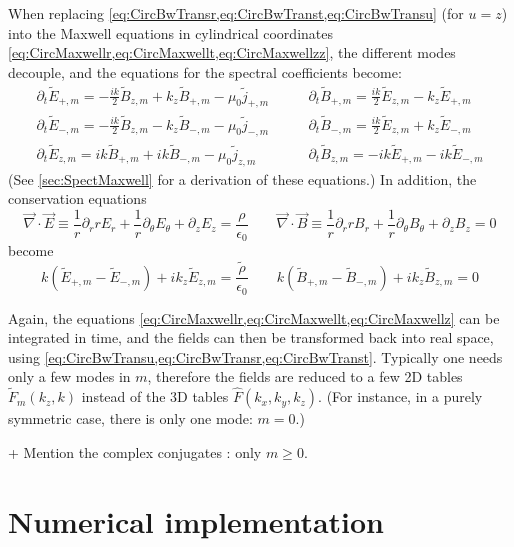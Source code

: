 \documentclass[a4paper]{article}   	%
\newcommand{\ir}{\frac{1}{r}}
\begin{document}
When replacing \cref{eq:CircBwTransr,eq:CircBwTranst,eq:CircBwTransu}
(for $u=z$) into the Maxwell equations in cylindrical
coordinates \cref{eq:CircMaxwellr,eq:CircMaxwellt,eq:CircMaxwellzz},
the different modes decouple, and the equations for the spectral
coefficients become:
\begin{align}
\partial_t \tilde{E}_{+,m} = - \frac{ik}{2}\tilde{B}_{z,m} + k_z\tilde{B}_{+,m} - \mu_0\tilde{j}_{+,m} \qquad &   
\partial_t \tilde{B}_{+,m} = \frac{ik}{2} \tilde{E}_{z,m} - k_z
\tilde{E}_{+,m} 
\label{eq:CircMaxwellp} \\
\partial_t \tilde{E}_{-,m} = -\frac{ik}{2} \tilde{B}_{z,m} - k_z \tilde{B}_{-,m} - \mu_0  \tilde{j}_{-,m} \qquad &   
\partial_t \tilde{B}_{-,m} = \frac{ik}{2} \tilde{E}_{z,m} + k_z
\tilde{E}_{-,m} \label{eq:CircMaxwellm} \\
\partial_t \tilde{E}_{z,m} = ik \tilde{B}_{+,m} + ik\tilde{B}_{-,m}  - \mu_0 \tilde{j}_{z,m}  \qquad & 
\partial_t \tilde{B}_{z,m} = -ik \tilde{E}_{+,m} - ik\tilde{E}_{-,m}  \label{eq:CircMaxwellz} 
\end{align}
(See \cref{sec:SpectMaxwell} for a derivation of these equations.) In addition, the conservation equations
\begin{equation}
\vec{\nabla}\cdot\vec{E} \equiv \ir \partial_r rE_r + \ir\partial_\theta E_\theta + \partial_z E_z
= \frac{\rho}{\epsilon_0} \qquad  \vec{\nabla}\cdot\vec{B} \equiv \ir \partial_r rB_r + \ir\partial_\theta B_\theta + \partial_z B_z
= 0 
\end{equation}
become
\begin{equation}
k(\tilde{E}_{+,m} -\tilde{E}_{-,m}) + ik_z \tilde{E}_{z,m} =
\frac{\tilde{\rho}}{\epsilon_0} \qquad
 k(\tilde{B}_{+,m} -\tilde{B}_{-,m}) + ik_z \tilde{B}_{z,m} =
0 \end{equation}

Again, the equations \cref{eq:CircMaxwellr,eq:CircMaxwellt,eq:CircMaxwellz}  can be
integrated in time, and the fields can then be transformed back into
real space, using \cref{eq:CircBwTransu,eq:CircBwTransr,eq:CircBwTranst}. Typically one needs only a few modes in $m$, therefore the
fields are reduced to a few 2D tables $\tilde{F}_m(k_z,k)$ instead of the 3D tables
$\hat{F}(k_x,k_y,k_z)$. (For instance, in a purely symmetric case, there is only one
mode: $m=0$.)

+ Mention the complex conjugates : only $m \geq 0$.


\section{Numerical implementation}
\end{document}
